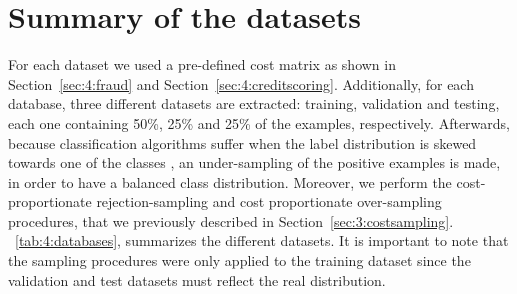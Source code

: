     
\section{Summary of the datasets}

For each dataset we used a pre-defined cost matrix as shown in Section~\ref{sec:4:fraud} and 
Section~\ref{sec:4:creditscoring}. Additionally,  for each database, three different 
datasets are extracted: training, validation and testing, each one containing 50\%, 25\% and 25\% 
of the examples, respectively. Afterwards, because classification algorithms suffer when the label 
distribution is skewed towards one of the classes \citep{Hastie2009}, an under-sampling of the 
positive examples is made, in order to have a balanced class distribution. Moreover, we perform the 
cost-proportionate rejection-sampling and cost proportionate over-sampling procedures, that we 
previously described in Section~\ref{sec:3:costsampling}. \tablename{~\ref{tab:4:databases}}, 
summarizes the different datasets. It is important to note that the sampling procedures were only 
applied to the training dataset since the validation and test datasets must reflect the real 
distribution.

